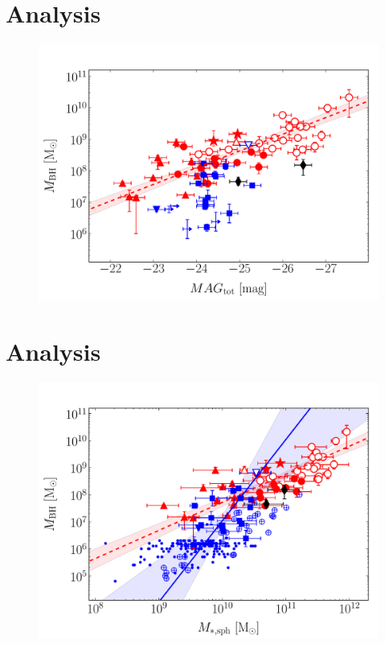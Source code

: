 \documentclass[preprint2]{emulateapj}
\begin{document}
\section{Analysis}
\label{sec:anal}
\begin{figure}[h]
\begin{center}
\includegraphics[width=\columnwidth]{images/mbh_vs_mag_tot.pdf}
\caption{}
\label{fig:}
\end{center}
\end{figure}



\section{Analysis}
\label{sec:anal}
\begin{figure}[h]
\begin{center}
\includegraphics[width=\columnwidth]{images/mbh_vs_mass_sph_agn.pdf}
\caption{}
\label{fig:}
\end{center}
\end{figure}
\end{document}
